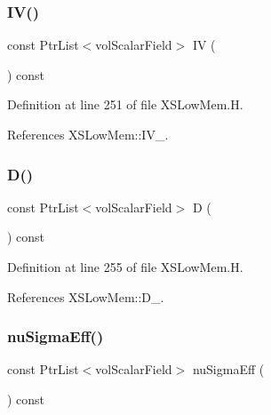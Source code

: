\subsubsection{\texorpdfstring{I\+V()}{IV()}}
{\footnotesize\ttfamily const Ptr\+List$<$vol\+Scalar\+Field$>$ IV (\begin{DoxyParamCaption}{ }\end{DoxyParamCaption}) const\hspace{0.3cm}{\ttfamily [inline]}}



Definition at line 251 of file X\+S\+Low\+Mem.\+H.



References X\+S\+Low\+Mem\+::\+I\+V\+\_\+.

\mbox{\label{classFoam_1_1XSLowMem_a183948adfa6649ba954e96d3ff1fb262}} 
\subsubsection{\texorpdfstring{D()}{D()}}
{\footnotesize\ttfamily const Ptr\+List$<$vol\+Scalar\+Field$>$ D (\begin{DoxyParamCaption}{ }\end{DoxyParamCaption}) const\hspace{0.3cm}{\ttfamily [inline]}}



Definition at line 255 of file X\+S\+Low\+Mem.\+H.



References X\+S\+Low\+Mem\+::\+D\+\_\+.

\mbox{\label{classFoam_1_1XSLowMem_a2d54b65ba527abfbece66dee3572e935}} 
\subsubsection{\texorpdfstring{nu\+Sigma\+Eff()}{nuSigmaEff()}}
{\footnotesize\ttfamily const Ptr\+List$<$vol\+Scalar\+Field$>$ nu\+Sigma\+Eff (\begin{DoxyParamCaption}{ }\end{DoxyParamCaption}) const\hspace{0.3cm}{\ttfamily [inline]}}



